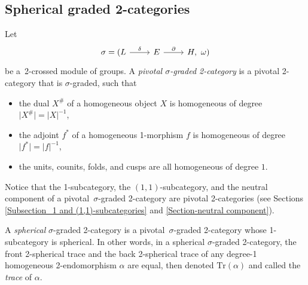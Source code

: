 \documentclass[a4paper, oneside]{amsart}
\numberwithin{equation}{subsection}
\theoremstyle{referencedlemma}
\theoremstyle{plain} %
\theoremstyle{remark}
\begin{document}
\subsection{Spherical graded 2-categories}\label{Subsection_Spherical graded 2-categories}
Let
$$
\begin{tikzcd}
\sigma = (L \arrow{r}{\delta} & E \arrow{r}{\partial} & H,\ \omega)
\end{tikzcd}
$$
be a~2-crossed module of groups.  A \emph{pivotal $\sigma$-graded 2-category} is a pivotal 2-category that is $\sigma$-graded, such that 
\begin{itemize}
\item the dual $X^\#$ of a homogeneous object $X$ is homogeneous of degree $\lvert X^\#\rvert = \lvert X \rvert^{-1}$,
\item the adjoint $f^*$ of a homogeneous 1-morphism $f$ is homogeneous of degree $\lvert f^*\rvert = \lvert f \rvert^{-1}$,
\item the units, counits, folds,  and cusps are all homogeneous of degree $1$.
\end{itemize}
Notice that the 1-subcategory, the $(1,1)$-subcategory, and the neutral component of a pivotal~$\sigma$-graded \mbox{2-category} are pivotal 2-categories (see Sections \ref{Subsection_1 and (1,1)-subcategories} and \ref{Section-neutral component}). 

A \emph{spherical} $\sigma$-graded 2-category is a pivotal~$\sigma$-graded 2-category whose 1-subcategory is spherical. In other words, in a spherical $\sigma$-graded 2-category,  the front 2-spherical trace and the back 2-spherical trace of any degree-1 homogeneous 2-endomorphism $\alpha$ are equal, then denoted $\mathrm{Tr}(\alpha)$ and called the \emph{trace} of $\alpha$.  
\end{document}
